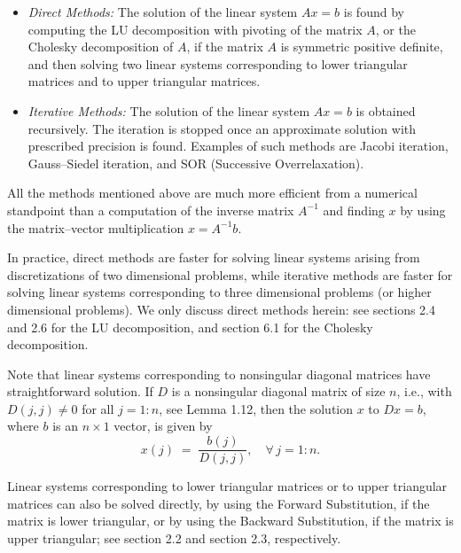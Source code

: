 \begin{itemize}
\item \textit{Direct Methods:} The solution of the linear system $Ax=b$ is found by
computing the LU decomposition with pivoting of the matrix $A$, or the Cholesky
decomposition of $A$, if the matrix $A$ is symmetric positive definite, and then
solving two linear systems corresponding to lower triangular matrices and to upper
triangular matrices.
\item \textit{Iterative Methods:} The solution of the linear system $Ax=b$ is obtained
recursively. The iteration is stopped once an approximate solution with prescribed
precision is found. Examples of such methods are Jacobi iteration, Gauss--Siedel
iteration, and SOR (Successive Overrelaxation).
\end{itemize}

All the methods mentioned above are much more efficient from a numerical standpoint
than a computation of the inverse matrix $A^{-1}$ and finding $x$ by using the
matrix--vector multiplication $x=A^{-1}b$.

In practice, direct methods are faster for solving linear systems arising from
discretizations of two dimensional problems, while iterative methods are faster for
solving linear systems corresponding to three dimensional problems (or higher
dimensional problems). We only discuss direct methods herein: see sections 2.4 and 2.6
for the LU decomposition, and section 6.1 for the Cholesky decomposition.

Note that linear systems corresponding to nonsingular diagonal matrices have
straightforward solution. If $D$ is a nonsingular diagonal matrix of size $n$, i.e.,
with $D(j,j)\neq 0$ for all $j=1:n$, see Lemma 1.12, then the solution $x$ to $Dx=b$,
where $b$ is an $n\times 1$ vector, is given by
\[
x(j) \;=\; \frac{b(j)}{D(j,j)}, \quad \forall\, j=1:n.
\]

Linear systems corresponding to lower triangular matrices or to upper triangular
matrices can also be solved directly, by using the Forward Substitution, if the matrix
is lower triangular, or by using the Backward Substitution, if the matrix is upper
triangular; see section 2.2 and section 2.3, respectively.
